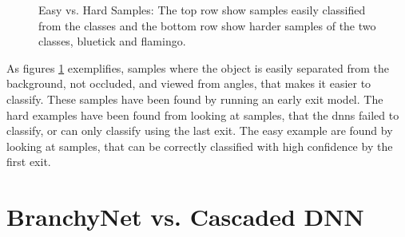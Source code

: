 \begin{figure}
	\captionsetup[subfigure]{justification=centering}
	\centering
	\hfill
	\caption[Easy vs. Hard Samples]{Easy vs. Hard Samples: The top row show samples easily classified from the classes and the bottom row show harder samples of the two classes, \protect{} bluetick and \protect{} flamingo. }
	\label{fig:hardvseasy}
\end{figure}

As figures \ref{fig:hardvseasy} exemplifies, samples where the object is easily separated from the background, not occluded, and viewed from angles, that makes it easier to classify. These samples have been found by running an early exit model. The hard examples have been found from looking at samples, that the \gls{dnn}s failed to classify, or can only classify using the last exit. The easy example are found by looking at samples, that can be correctly classified with high confidence by the first exit.

\section{BranchyNet vs. Cascaded DNN} \label{sec:ee-branchy-vs-cascaded}

